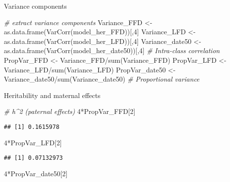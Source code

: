 \documentclass[
]{article}
\newenvironment{Shaded}{\begin{snugshade}}{\end{snugshade}}
\newcommand{\CommentTok}[1]{\textcolor[rgb]{0.56,0.35,0.01}{\textit{#1}}}
\newcommand{\DecValTok}[1]{\textcolor[rgb]{0.00,0.00,0.81}{#1}}
\newcommand{\FunctionTok}[1]{\textcolor[rgb]{0.00,0.00,0.00}{#1}}
\newcommand{\NormalTok}[1]{#1}
\newcommand{\OtherTok}[1]{\textcolor[rgb]{0.56,0.35,0.01}{#1}}
\newcommand{\SpecialCharTok}[1]{\textcolor[rgb]{0.00,0.00,0.00}{#1}}
\begin{document}
Variance components

\begin{Shaded}
\begin{Highlighting}[]
\CommentTok{\# extract variance components}
\NormalTok{Variance\_FFD }\OtherTok{\textless{}{-}} \FunctionTok{as.data.frame}\NormalTok{(}\FunctionTok{VarCorr}\NormalTok{(model\_her\_FFD))[,}\DecValTok{4}\NormalTok{] }
\NormalTok{Variance\_LFD }\OtherTok{\textless{}{-}} \FunctionTok{as.data.frame}\NormalTok{(}\FunctionTok{VarCorr}\NormalTok{(model\_her\_LFD))[,}\DecValTok{4}\NormalTok{] }
\NormalTok{Variance\_date50 }\OtherTok{\textless{}{-}} \FunctionTok{as.data.frame}\NormalTok{(}\FunctionTok{VarCorr}\NormalTok{(model\_her\_date50))[,}\DecValTok{4}\NormalTok{] }
\CommentTok{\# Intra{-}class correlation}
\NormalTok{PropVar\_FFD }\OtherTok{\textless{}{-}}\NormalTok{ Variance\_FFD}\SpecialCharTok{/}\FunctionTok{sum}\NormalTok{(Variance\_FFD) }
\NormalTok{PropVar\_LFD }\OtherTok{\textless{}{-}}\NormalTok{ Variance\_LFD}\SpecialCharTok{/}\FunctionTok{sum}\NormalTok{(Variance\_LFD) }
\NormalTok{PropVar\_date50 }\OtherTok{\textless{}{-}}\NormalTok{ Variance\_date50}\SpecialCharTok{/}\FunctionTok{sum}\NormalTok{(Variance\_date50) }
\CommentTok{\# Proportional variance}
\end{Highlighting}
\end{Shaded}

Heritability and maternal effects

\begin{Shaded}
\begin{Highlighting}[]
\CommentTok{\# h\^{}2 (paternal effects)}
\DecValTok{4}\SpecialCharTok{*}\NormalTok{PropVar\_FFD[}\DecValTok{2}\NormalTok{]}
\end{Highlighting}
\end{Shaded}

\begin{verbatim}
## [1] 0.1615978
\end{verbatim}

\begin{Shaded}
\begin{Highlighting}[]
\DecValTok{4}\SpecialCharTok{*}\NormalTok{PropVar\_LFD[}\DecValTok{2}\NormalTok{]}
\end{Highlighting}
\end{Shaded}

\begin{verbatim}
## [1] 0.07132973
\end{verbatim}

\begin{Shaded}
\begin{Highlighting}[]
\DecValTok{4}\SpecialCharTok{*}\NormalTok{PropVar\_date50[}\DecValTok{2}\NormalTok{]}
\end{Highlighting}
\end{Shaded}
\end{document}
